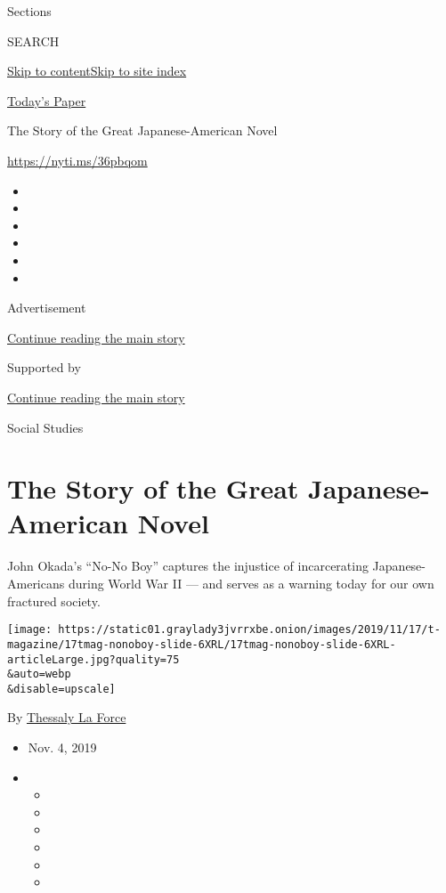 Sections

SEARCH

\protect\hyperlink{site-content}{Skip to
content}\protect\hyperlink{site-index}{Skip to site index}

\href{https://myaccount.nytimes3xbfgragh.onion/auth/login?response_type=cookie\&client_id=vi}{}

\href{https://www.nytimes3xbfgragh.onion/section/todayspaper}{Today's
Paper}

The Story of the Great Japanese-American Novel

\url{https://nyti.ms/36pbqom}

\begin{itemize}
\item
\item
\item
\item
\item
\item
\end{itemize}

Advertisement

\protect\hyperlink{after-top}{Continue reading the main story}

Supported by

\protect\hyperlink{after-sponsor}{Continue reading the main story}

Social Studies

\hypertarget{the-story-of-the-great-japanese-american-novel}{%
\section{The Story of the Great Japanese-American
Novel}\label{the-story-of-the-great-japanese-american-novel}}

John Okada's ``No-No Boy'' captures the injustice of incarcerating
Japanese-Americans during World War II --- and serves as a warning today
for our own fractured society.

\texttt{[image: https://static01.graylady3jvrrxbe.onion/images/2019/11/17/t-magazine/17tmag-nonoboy-slide-6XRL/17tmag-nonoboy-slide-6XRL-articleLarge.jpg?quality=75\\\&auto=webp\\\&disable=upscale]}

By
\href{https://www.nytimes3xbfgragh.onion/by/thessaly-la-force}{Thessaly
La Force}

\begin{itemize}
\item
  Nov. 4, 2019
\item
  \begin{itemize}
  \item
  \item
  \item
  \item
  \item
  \item
  \end{itemize}
\end{itemize}

